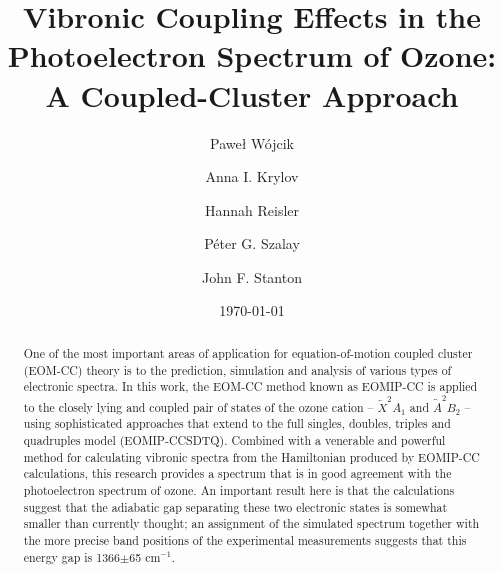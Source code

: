 \documentclass[
12pt,
a4paper,
prb,
superscriptaddress,
tightenlines,  %
]{revtex4}
\begin{document}
\title{Vibronic Coupling Effects in the Photoelectron Spectrum of Ozone: A
Coupled-Cluster Approach}

\author{Pawe{\l} W{\'o}jcik}

\author{Anna I. Krylov}

\author{Hannah Reisler}

\author{P{\'e}ter G. Szalay}

\author{John F. Stanton}

\date{\today}

\begin{abstract}
One of the most important areas of application for equation-of-motion coupled
cluster (EOM-CC) theory is to the prediction, simulation and analysis of
various types of electronic spectra.   In this work, the EOM-CC method known
as EOMIP-CC is applied to the closely lying and coupled pair of states of the
ozone cation -- ${\tilde X}^2A_1$ and ${\tilde A}^2B_2$ -- using sophisticated
approaches that extend to the full singles, doubles, triples and quadruples
model (EOMIP-CCSDTQ).   Combined with a venerable and powerful method for
calculating vibronic spectra from the Hamiltonian produced by EOMIP-CC
calculations, this research provides a spectrum that is in good agreement with
the photoelectron spectrum of ozone.   An important result here is that the
calculations suggest that the adiabatic gap separating these two electronic
states is somewhat smaller than currently thought; an assignment of the
simulated spectrum together with the more precise band positions of the
experimental measurements suggests that this energy gap is 1366$\pm$65
cm$^{-1}$.
\end{abstract}
\end{document}
